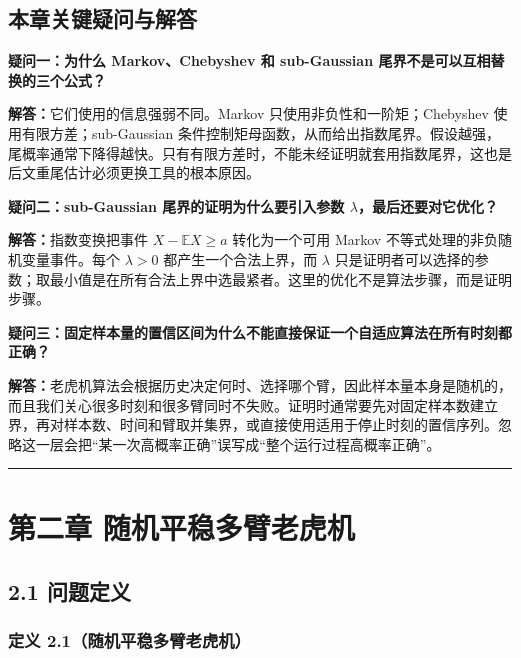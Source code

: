 \documentclass[
  11pt,
  a4paper,
]{ctexart}
\begin{document}
\subsection{本章关键疑问与解答}\label{ux672cux7ae0ux5173ux952eux7591ux95ee}

\textbf{疑问一：为什么 Markov、Chebyshev 和 sub-Gaussian 尾界不是可以互相替换的三个公式？}

\textbf{解答：}它们使用的信息强弱不同。Markov 只使用非负性和一阶矩；Chebyshev 使用有限方差；sub-Gaussian 条件控制矩母函数，从而给出指数尾界。假设越强，尾概率通常下降得越快。只有有限方差时，不能未经证明就套用指数尾界，这也是后文重尾估计必须更换工具的根本原因。

\textbf{疑问二：sub-Gaussian 尾界的证明为什么要引入参数 \(\lambda\)，最后还要对它优化？}

\textbf{解答：}指数变换把事件 \(X-\mathbb EX\ge a\) 转化为一个可用 Markov 不等式处理的非负随机变量事件。每个 \(\lambda>0\) 都产生一个合法上界，而 \(\lambda\) 只是证明者可以选择的参数；取最小值是在所有合法上界中选最紧者。这里的优化不是算法步骤，而是证明步骤。

\textbf{疑问三：固定样本量的置信区间为什么不能直接保证一个自适应算法在所有时刻都正确？}

\textbf{解答：}老虎机算法会根据历史决定何时、选择哪个臂，因此样本量本身是随机的，而且我们关心很多时刻和很多臂同时不失败。证明时通常要先对固定样本数建立界，再对样本数、时间和臂取并集界，或直接使用适用于停止时刻的置信序列。忽略这一层会把“某一次高概率正确”误写成“整个运行过程高概率正确”。

\begin{center}\rule{0.5\linewidth}{0.5pt}\end{center}

\section{第二章
随机平稳多臂老虎机}\label{ux7b2cux4e8cux7ae0-ux968fux673aux5e73ux7a33ux591aux81c2ux8001ux864eux673a}

\subsection{2.1 问题定义}\label{ux95eeux9898ux5b9aux4e49}

\subsubsection{定义
2.1（随机平稳多臂老虎机）}\label{ux5b9aux4e49-2.1ux968fux673aux5e73ux7a33ux591aux81c2ux8001ux864eux673a}
\end{document}
